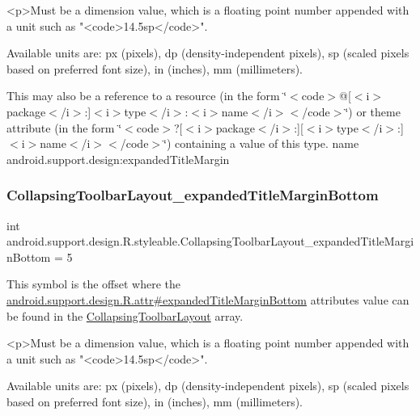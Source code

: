 \begin{DoxyVerb}      <p>Must be a dimension value, which is a floating point number appended with a unit such as "<code>14.5sp</code>".
\end{DoxyVerb}
 Available units are\+: px (pixels), dp (density-\/independent pixels), sp (scaled pixels based on preferred font size), in (inches), mm (millimeters). 

This may also be a reference to a resource (in the form \char`\"{}$<$code$>$@\mbox{[}$<$i$>$package$<$/i$>$\+:\mbox{]}$<$i$>$type$<$/i$>$\+:$<$i$>$name$<$/i$>$$<$/code$>$\char`\"{}) or theme attribute (in the form \char`\"{}$<$code$>$?\mbox{[}$<$i$>$package$<$/i$>$\+:\mbox{]}\mbox{[}$<$i$>$type$<$/i$>$\+:\mbox{]}$<$i$>$name$<$/i$>$$<$/code$>$\char`\"{}) containing a value of this type.  name android.\+support.\+design\+:expanded\+Title\+Margin \mbox{\label{classandroid_1_1support_1_1design_1_1R_1_1styleable_af49b937af4809fe755f0935bab497665}} 
\subsubsection{\texorpdfstring{Collapsing\+Toolbar\+Layout\+\_\+expanded\+Title\+Margin\+Bottom}{CollapsingToolbarLayout\_expandedTitleMarginBottom}}
{\footnotesize\ttfamily int android.\+support.\+design.\+R.\+styleable.\+Collapsing\+Toolbar\+Layout\+\_\+expanded\+Title\+Margin\+Bottom = 5\hspace{0.3cm}{\ttfamily [static]}}

This symbol is the offset where the \hyperlink{classandroid_1_1support_1_1design_1_1R_1_1attr_a82d8696e9d3143d7e7a033ac65f01c38}{android.\+support.\+design.\+R.\+attr\#expanded\+Title\+Margin\+Bottom} attribute\textquotesingle{}s value can be found in the \hyperlink{classandroid_1_1support_1_1design_1_1R_1_1styleable_a4a019838b1c3daad84b4ffff397db335}{Collapsing\+Toolbar\+Layout} array.

\begin{DoxyVerb}      <p>Must be a dimension value, which is a floating point number appended with a unit such as "<code>14.5sp</code>".
\end{DoxyVerb}
 Available units are\+: px (pixels), dp (density-\/independent pixels), sp (scaled pixels based on preferred font size), in (inches), mm (millimeters). 

